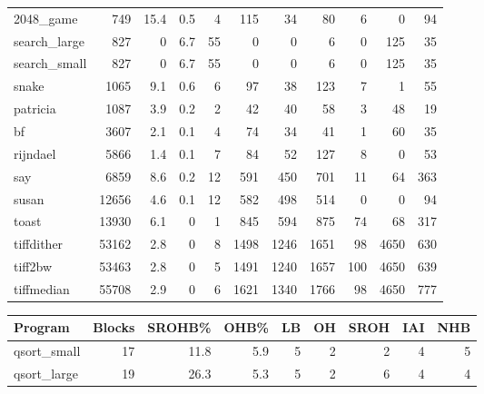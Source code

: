 \begin{tabular}{lrrrrrrrrrr}
 2048\_game       &            749 &     15.4 &    0.5 &    4 &    115 &         34 &           80 &     6 &     0 &    94 \\
 search\_large    &            827 &      0   &    6.7 &   55 &      0 &          0 &            6 &     0 &   125 &    35 \\
 search\_small    &            827 &      0   &    6.7 &   55 &      0 &          0 &            6 &     0 &   125 &    35 \\
 snake           &           1065 &      9.1 &    0.6 &    6 &     97 &         38 &          123 &     7 &     1 &    55 \\
 patricia        &           1087 &      3.9 &    0.2 &    2 &     42 &         40 &           58 &     3 &    48 &    19 \\
 bf              &           3607 &      2.1 &    0.1 &    4 &     74 &         34 &           41 &     1 &    60 &    35 \\
 rijndael        &           5866 &      1.4 &    0.1 &    7 &     84 &         52 &          127 &     8 &     0 &    53 \\
 say             &           6859 &      8.6 &    0.2 &   12 &    591 &        450 &          701 &    11 &    64 &   363 \\
 susan           &          12656 &      4.6 &    0.1 &   12 &    582 &        498 &          514 &     0 &     0 &    94 \\
 toast           &          13930 &      6.1 &    0   &    1 &    845 &        594 &          875 &    74 &    68 &   317 \\
 tiffdither      &          53162 &      2.8 &    0   &    8 &   1498 &       1246 &         1651 &    98 &  4650 &   630 \\
 tiff2bw         &          53463 &      2.8 &    0   &    5 &   1491 &       1240 &         1657 &   100 &  4650 &   639 \\
 tiffmedian      &          55708 &      2.9 &    0   &    6 &   1621 &       1340 &         1766 &    98 &  4650 &   777 \\
\hline
\end{tabular}\begin{tabular}{lrrrrrrrr}
\hline
 Program         &   Blocks &   SROHB\% &   OHB\% &   LB &   OH &   SROH &   IAI &   NHB \\
\hline
 qsort\_small     &       17 &     11.8 &    5.9 &    5 &    2 &      2 &     4 &     5 \\
 qsort\_large     &       19 &     26.3 &    5.3 &    5 &    2 &      6 &     4 &     4 \\

\end{tabular}
